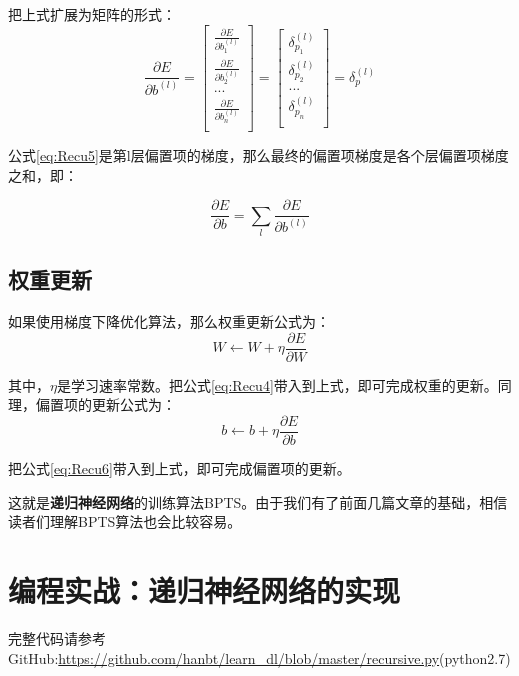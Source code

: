 把上式扩展为矩阵的形式：
\begin{equation}
	\label{eq:Recu5}
	\frac{\partial{E}}{\partial{{b}^{(l)}}}=
	\begin{bmatrix}
		\frac{\partial{E}}{\partial{b_1^{(l)}}} \\
		\frac{\partial{E}}{\partial{b_2^{(l)}}} \\
		...                                     \\
		\frac{\partial{E}}{\partial{b_n^{(l)}}} \\
	\end{bmatrix}=
	\begin{bmatrix}
		\delta_{p_1}^{(l)} \\
		\delta_{p_2}^{(l)} \\
		...                \\
		\delta_{p_n}^{(l)} \\
	\end{bmatrix}=\delta_p^{{(l)}}
\end{equation}

公式\ref{eq:Recu5}是第l层偏置项的梯度，那么最终的偏置项梯度是各个层偏置项梯度之和，即：

\begin{equation}
	\label{eq:Recu6}
	\frac{\partial{E}}{\partial{{b}}}=\sum_l\frac{\partial{E}}{\partial{{b}^{(l)}}}
\end{equation}

\subsection{权重更新}\label{Recu:6}

如果使用梯度下降优化算法，那么权重更新公式为：
\[
	W\gets W + \eta\frac{\partial{E}}{\partial{W}}
\]

其中，\(\eta\)是学习速率常数。把公式\ref{eq:Recu4}带入到上式，即可完成权重的更新。同理，偏置项的更新公式为：
\[
	{b}\gets {b} + \eta\frac{\partial{E}}{\partial{{b}}}
\]

把公式\ref{eq:Recu6}带入到上式，即可完成偏置项的更新。

这就是\textbf{递归神经网络}的训练算法BPTS。由于我们有了前面几篇文章的基础，相信读者们理解BPTS算法也会比较容易。

\section{编程实战：递归神经网络的实现}\label{Recu:7}

\begin{note}
	完整代码请参考GitHub:\url{https://github.com/hanbt/learn_dl/blob/master/recursive.py}(python2.7)
\end{note}

